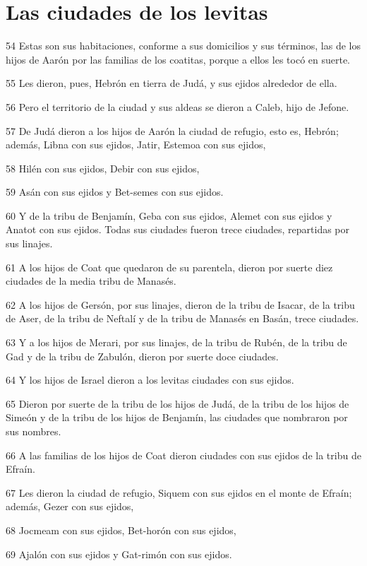 \section*{Las ciudades de los levitas}

\par 54 Estas son sus habitaciones, conforme a sus domicilios y sus términos, las de los hijos de Aarón por las familias de los coatitas, porque a ellos les tocó en suerte.
\par 55 Les dieron, pues, Hebrón en tierra de Judá, y sus ejidos alrededor de ella.
\par 56 Pero el territorio de la ciudad y sus aldeas se dieron a Caleb, hijo de Jefone.
\par 57 De Judá dieron a los hijos de Aarón la ciudad de refugio, esto es, Hebrón; además, Libna con sus ejidos, Jatir, Estemoa con sus ejidos,
\par 58 Hilén con sus ejidos, Debir con sus ejidos,
\par 59 Asán con sus ejidos y Bet-semes con sus ejidos.
\par 60 Y de la tribu de Benjamín, Geba con sus ejidos, Alemet con sus ejidos y Anatot con sus ejidos. Todas sus ciudades fueron trece ciudades, repartidas por sus linajes.
\par 61 A los hijos de Coat que quedaron de su parentela, dieron por suerte diez ciudades de la media tribu de Manasés.
\par 62 A los hijos de Gersón, por sus linajes, dieron de la tribu de Isacar, de la tribu de Aser, de la tribu de Neftalí y de la tribu de Manasés en Basán, trece ciudades.
\par 63 Y a los hijos de Merari, por sus linajes, de la tribu de Rubén, de la tribu de Gad y de la tribu de Zabulón, dieron por suerte doce ciudades.
\par 64 Y los hijos de Israel dieron a los levitas ciudades con sus ejidos.
\par 65 Dieron por suerte de la tribu de los hijos de Judá, de la tribu de los hijos de Simeón y de la tribu de los hijos de Benjamín, las ciudades que nombraron por sus nombres.
\par 66 A las familias de los hijos de Coat dieron ciudades con sus ejidos de la tribu de Efraín.
\par 67 Les dieron la ciudad de refugio, Siquem con sus ejidos en el monte de Efraín; además, Gezer con sus ejidos,
\par 68 Jocmeam con sus ejidos, Bet-horón con sus ejidos,
\par 69 Ajalón con sus ejidos y Gat-rimón con sus ejidos.
